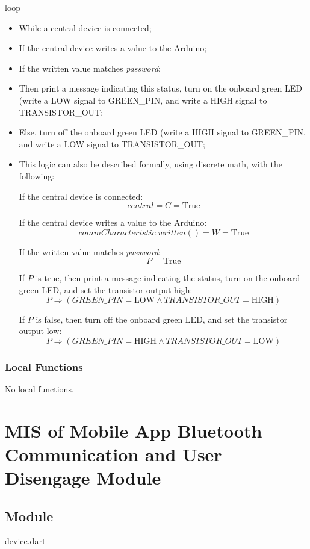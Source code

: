 \documentclass[12pt, titlepage]{article}
\begin{document}
\noindent loop
\begin{itemize}
\item While a central device is connected;
\item If the central device writes a value to the Arduino;
\item If the written value matches \textit{password};
\item Then print a message indicating this status, turn on the onboard green LED (write a LOW signal to GREEN\_PIN, and write a HIGH signal to TRANSISTOR\_OUT;
\item Else, turn off the onboard green LED (write a HIGH signal to GREEN\_PIN, and write a LOW signal to TRANSISTOR\_OUT;
\item This logic can also be described formally, using discrete math, with the following:

If the central device is connected:
$$central = C = \text{True}$$

If the central device writes a value to the Arduino:
$$commCharacteristic.written() = W = \text{True}$$

If the written value matches \textit{password}:
$$P = \text{True}$$

If $P$ is true, then print a message indicating the status, turn on the onboard green LED, and set the transistor output high:
$$P \Rightarrow (GREEN\_PIN = \text{LOW} \land TRANSISTOR\_OUT = \text{HIGH})$$

If $P$ is false, then turn off the onboard green LED, and set the transistor output low:
$$P \Rightarrow (GREEN\_PIN = \text{HIGH} \land TRANSISTOR\_OUT = \text{LOW})$$
\end{itemize}

\subsubsection{Local Functions}

No local functions.




\section{MIS of Mobile App Bluetooth Communication and User Disengage Module} \label{mHD}

\subsection{Module}
device.dart
\end{document}

